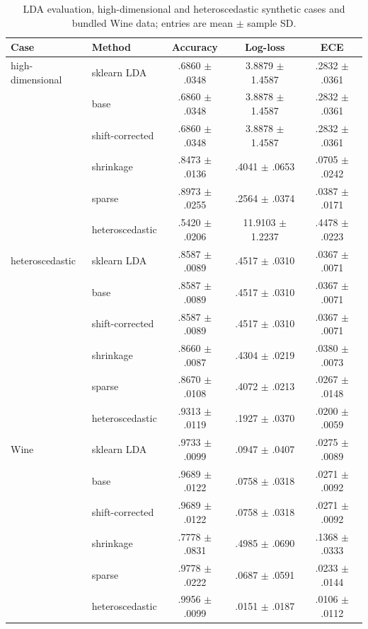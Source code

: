 \documentclass[conference]{IEEEtran}
\begin{document}
\begin{table}[t]
\centering\scriptsize
\setlength{\tabcolsep}{3pt}
\caption{LDA evaluation, high-dimensional and heteroscedastic synthetic cases and bundled Wine data; entries are mean $\pm$ sample SD.}
\label{tab:lda-main-b}
\begin{tabular}{llccc}
\toprule
Case & Method & Accuracy & Log-loss & ECE \\
\midrule
high-dimensional & sklearn LDA & .6860 $\pm$ .0348 & 3.8879 $\pm$ 1.4587 & .2832 $\pm$ .0361 \\
 & base & .6860 $\pm$ .0348 & 3.8878 $\pm$ 1.4587 & .2832 $\pm$ .0361 \\
 & shift-corrected & .6860 $\pm$ .0348 & 3.8878 $\pm$ 1.4587 & .2832 $\pm$ .0361 \\
 & shrinkage & .8473 $\pm$ .0136 & .4041 $\pm$ .0653 & .0705 $\pm$ .0242 \\
 & sparse & .8973 $\pm$ .0255 & .2564 $\pm$ .0374 & .0387 $\pm$ .0171 \\
 & heteroscedastic & .5420 $\pm$ .0206 & 11.9103 $\pm$ 1.2237 & .4478 $\pm$ .0223 \\
\midrule
heteroscedastic & sklearn LDA & .8587 $\pm$ .0089 & .4517 $\pm$ .0310 & .0367 $\pm$ .0071 \\
 & base & .8587 $\pm$ .0089 & .4517 $\pm$ .0310 & .0367 $\pm$ .0071 \\
 & shift-corrected & .8587 $\pm$ .0089 & .4517 $\pm$ .0310 & .0367 $\pm$ .0071 \\
 & shrinkage & .8660 $\pm$ .0087 & .4304 $\pm$ .0219 & .0380 $\pm$ .0073 \\
 & sparse & .8670 $\pm$ .0108 & .4072 $\pm$ .0213 & .0267 $\pm$ .0148 \\
 & heteroscedastic & .9313 $\pm$ .0119 & .1927 $\pm$ .0370 & .0200 $\pm$ .0059 \\
\midrule
Wine & sklearn LDA & .9733 $\pm$ .0099 & .0947 $\pm$ .0407 & .0275 $\pm$ .0089 \\
 & base & .9689 $\pm$ .0122 & .0758 $\pm$ .0318 & .0271 $\pm$ .0092 \\
 & shift-corrected & .9689 $\pm$ .0122 & .0758 $\pm$ .0318 & .0271 $\pm$ .0092 \\
 & shrinkage & .7778 $\pm$ .0831 & .4985 $\pm$ .0690 & .1368 $\pm$ .0333 \\
 & sparse & .9778 $\pm$ .0222 & .0687 $\pm$ .0591 & .0233 $\pm$ .0144 \\
 & heteroscedastic & .9956 $\pm$ .0099 & .0151 $\pm$ .0187 & .0106 $\pm$ .0112 \\
\bottomrule
\end{tabular}
\end{table}
\end{document}
